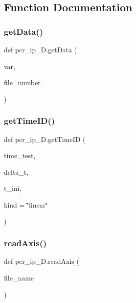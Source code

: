 \subsection{Function Documentation}
\mbox{\label{namespacepcr__ip__2D_a265aa413c60e846683ff66d83ff2f1f0}} 
\subsubsection{\texorpdfstring{get\+Data()}{getData()}}
{\footnotesize\ttfamily def pcr\+\_\+ip\+\_\+D.\+get\+Data (\begin{DoxyParamCaption}\item[{}]{var,  }\item[{}]{file\+\_\+number }\end{DoxyParamCaption})}

\mbox{\label{namespacepcr__ip__2D_a5b61f4fcc6e641b5bb012f573b0495b3}} 
\subsubsection{\texorpdfstring{get\+Time\+I\+D()}{getTimeID()}}
{\footnotesize\ttfamily def pcr\+\_\+ip\+\_\+D.\+get\+Time\+ID (\begin{DoxyParamCaption}\item[{}]{time\+\_\+test,  }\item[{}]{delta\+\_\+t,  }\item[{}]{t\+\_\+ini,  }\item[{}]{kind = {\ttfamily \char`\"{}linear\char`\"{}} }\end{DoxyParamCaption})}

\mbox{\label{namespacepcr__ip__2D_a390f95786710e7e1249495452b874692}} 
\subsubsection{\texorpdfstring{read\+Axis()}{readAxis()}}
{\footnotesize\ttfamily def pcr\+\_\+ip\+\_\+D.\+read\+Axis (\begin{DoxyParamCaption}\item[{}]{file\+\_\+name }\end{DoxyParamCaption})}

